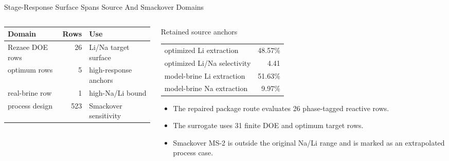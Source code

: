 \documentclass[aspectratio=169]{beamer}
\begin{document}
\begin{frame}{Stage-Response Surface Spans Source And Smackover Domains}
  \small
  \begin{columns}[T,onlytextwidth]
    \begin{column}{0.54\textwidth}
      \footnotesize
      \begin{tabular}{@{}lrl@{}}
        \toprule
        Domain & Rows & Use \\
        \midrule
        Rezaee DOE rows & 26 & Li/Na target surface \\
        optimum rows & 5 & high-response anchors \\
        real-brine row & 1 & high-Na/Li bound \\
        process design & 523 & Smackover sensitivity \\
        \bottomrule
      \end{tabular}
    \end{column}
    \begin{column}{0.42\textwidth}
      \begin{exampleblock}{Retained source anchors}
        \begin{tabular}{@{}lr@{}}
          optimized Li extraction & 48.57\% \\
          optimized Li/Na selectivity & 4.41 \\
          model-brine Li extraction & 51.63\% \\
          model-brine Na extraction & 9.97\% \\
        \end{tabular}
      \end{exampleblock}
      \begin{itemize}
        \item The repaired package route evaluates 26 phase-tagged reactive rows.
        \item The surrogate uses 31 finite DOE and optimum target rows.
        \item Smackover MS-2 is outside the original Na/Li range and is marked as an extrapolated process case.
      \end{itemize}
    \end{column}
  \end{columns}
\end{frame}
\end{document}
